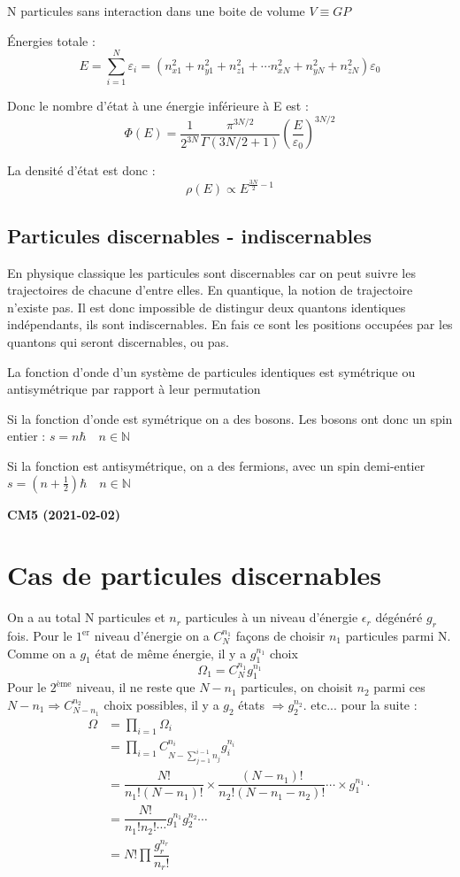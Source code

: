 \documentclass[12pt,a4paper]{report}
\newcommand{\ens}[1]{\mathbb{#1}}
\begin{document}
N particules sans interaction dans une boite de volume \( V \equiv GP\)

Énergies totale :
\[
	E = \sum_{i = 1}^N \varepsilon_i = (n_{x1}^2 + n_{y1}^2 + n_{z1}^2 + \cdots n_{xN}^2 + n_{yN}^2 + n_{zN}^2)\varepsilon_0
\]

Donc le nombre d'état à  une énergie inférieure à E est :
\[
	\Phi(E) = \dfrac{1}{2^{3N}} \dfrac{\pi^{3N/2}}{\Gamma(3N/2 + 1)} \left( \dfrac{E}{\varepsilon_0}\right)^{3N/2}
\]

La densité d'état est donc :
\[
	\rho(E) \propto E^{\frac{3N}{2} - 1}
\]

\subsection{Particules discernables - indiscernables}

En physique classique les particules sont discernables car on peut suivre les trajectoires de chacune d'entre elles.
En quantique, la notion de trajectoire n'existe pas.
Il est donc impossible de distingur deux quantons identiques indépendants, ils sont indiscernables.
En fais ce sont les positions occupées par les quantons qui seront discernables, ou pas.

La fonction d'onde d'un système de particules identiques est symétrique ou antisymétrique par rapport à leur permutation

Si la fonction d'onde est symétrique on a des bosons.
Les bosons ont donc un spin entier : \(s = n \hbar \quad  n \in \ens{N}\)

Si la fonction est antisymétrique, on a des fermions, avec un spin demi-entier \(s = (n + \frac{1}{2}) \hbar \quad n \in \ens{N}\)

\begin{center}
\textbf{CM5 (2021-02-02)}
\end{center}

\section{Cas de particules discernables}

On a au total N particules et $n_r$ particules à un niveau d'énergie $\epsilon_r$ dégénéré $g_r$ fois.
Pour le $1^{\text{er}}$ niveau d'énergie on a $C_N^{n_1}$ façons de choisir $n_1$ particules parmi N.
Comme on a $g_1$ état de même énergie, il y a $g_1^{n_1}$ choix
\[
	\Omega_1 = C_N^{n_1} g_1^{n_1}
\]
Pour le $2^{\text{ème}}$ niveau, il ne reste que $N - n_1$ particules, on choisit $n_2$ parmi ces $N - n_1 \Rightarrow C_{N-n_1}^{n_2}$ choix possibles, il y a $g_2$ états $\Rightarrow g_2^{n_2}$.
etc... pour la suite :
\begin{align*}
	\Omega &= \prod_{i=1} \Omega_i\\
	&= \prod_{i=1} C_{N-\sum_{j=1}^{i-1} n_j}^{n_i} g_i^{n_i}\\
	&= \dfrac{N!}{n_1!(N-n_1)!} \times \dfrac{(N-n_1)!}{n_2!(N-n_1-n_2)!}\cdots \times g_1^{n_1} \cdot\\
	&= \dfrac{N!}{n_1!n_2! \cdots} g_1^{n_1}g_2^{n_2} \cdots\\
	&= N! \prod \dfrac{g_r^{n_r}}{n_r!}
\end{align*}
\end{document}
